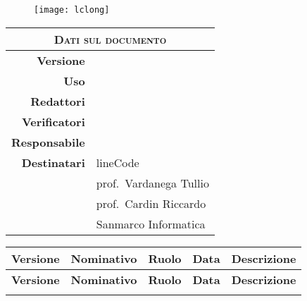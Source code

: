 \title{\huge \textsc{\phTitle{}} \\
	\vspace{11pt} \large \textsc{\phDate{}}}

\author{} %
\date{} %


\begin{figure}[t!]
	\centering
	\texttt{[image: lclong]}
\end{figure}

\maketitle
\thispagestyle{empty}

\begin{table}[ht]
	\begin{center}
		\label{tab:Dati sul documento}
		\begin{tabular}{r|l}
			\multicolumn{2}{c}{ \textsc{Dati sul documento} } \\
			\hline
			\textbf{Versione} & \versione{} \\
			\textbf{Uso} & \uso{}  \\
			\textbf{Redattori} & \redattori{} \\
			\textbf{Verificatori} & \verificatori{} \\
			\textbf{Responsabile} & \responsabile{} \\
			\textbf{Destinatari} & lineCode \\
								& prof.\ Vardanega Tullio \\		
								& prof.\ Cardin Riccardo \\
			\ifthenelse{\equal{\uso}{Esterno}}{
								& Sanmarco Informatica
			}{} \\
		\end{tabular}
	\end{center}
\end{table}

\newpage

\renewcommand{\arraystretch}{2} %
\begin{longtable}[H]{>{\centering\bfseries}m{2cm} >{\centering}m{3.5cm} >{\centering}m{2.5cm} >{\centering}m{3cm} >{\centering\arraybackslash}m{5cm}}
	\rowcolor{lightgray}
	{\textbf{Versione}} & {\textbf{Nominativo}} & {\textbf{Ruolo}} & {\textbf{Data}} & {\textbf{Descrizione}}  \\
	\endfirsthead%
	\rowcolor{lightgray}
	{\textbf{Versione}} & {\textbf{Nominativo}}  & {\textbf{Ruolo}} & {\textbf{Data}} & {\textbf{Descrizione}}  \\
	\endhead%
	\modifiche{}%
\end{longtable}